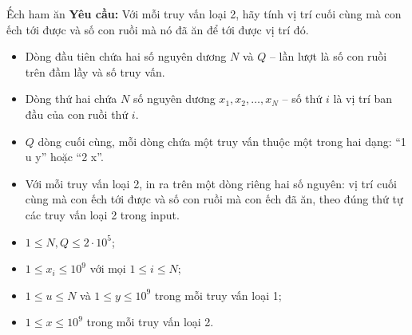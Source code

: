 \documentclass[11pt, a4paper, oneside]{article}
\begin{document}
\begin{problem}[input = jumping-frog.inp, output = jumping-frog.out, time = 2, memory = 512]{Ếch ham ăn}
\textbf{Yêu cầu:} Với mỗi truy vấn loại 2, hãy tính vị trí cuối cùng mà con ếch tới được và số con ruồi mà nó đã ăn để tới được vị trí đó.

\InputFile
\begin{itemize}
    \item Dòng đầu tiên chứa hai số nguyên dương $N$ và $Q$ -- lần lượt là số con ruồi trên đầm lầy và số truy vấn.
    \item Dòng thứ hai chứa $N$ số nguyên dương $x_1, x_2, \ldots, x_N$ -- số thứ $i$ là vị trí ban đầu của con ruồi thứ $i$.
    \item $Q$ dòng cuối cùng, mỗi dòng chứa một truy vấn thuộc một trong hai dạng: ``1 u y'' hoặc ``2 x''.
\end{itemize}

\OutputFile
\begin{itemize}
    \item Với mỗi truy vấn loại 2, in ra trên một dòng riêng hai số nguyên: vị trí cuối cùng mà con ếch tới được và số con ruồi mà con ếch đã ăn, theo đúng thứ tự các truy vấn loại 2 trong input.
\end{itemize}

\Constraints
\begin{itemize}
    \item $1 \le N, Q \le 2 \cdot 10^5$;
    \item $1 \le x_i \le 10^9$ với mọi $1 \le i \le N$;
    \item $1 \le u \le N$ và $1 \le y \le 10^9$ trong mỗi truy vấn loại 1;
    \item $1 \le x \le 10^9$ trong mỗi truy vấn loại 2.
\end{itemize}

\begin{subtasks}
\end{subtasks}

\end{problem}
\end{document}
